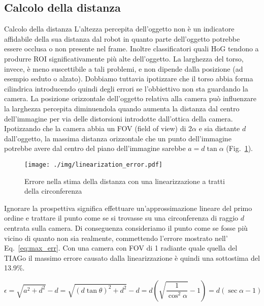 \documentclass[10pt]{beamer}
\begin{document}
	\subsection{Calcolo della distanza}\label{subsec:Calcolo-della-distanza}
	\begin{frame}[allowframebreaks]{Calcolo della distanza}
		L'altezza percepita dell'oggetto non è un indicatore affidabile della
		sua distanza dal robot in quanto parte dell'oggetto potrebbe essere
		occlusa o non presente nel frame. Inoltre classificatori quali HoG
		tendono a produrre ROI significativamente più alte dell'oggetto. La
		larghezza del torso, invece, è meno suscettibile a tali problemi, e non
		dipende dalla posizione (ad esempio seduto o alzato). Dobbiamo tuttavia
		ipotizzare che il torso abbia forma cilindrica introducendo quindi
		degli errori se l'obbiettivo non sta guardando la camera.	La
		posizione orizzontale dell'oggetto relativa alla camera può influenzare
		la larghezza percepita diminuendola quando aumenta la distanza dal
		centro dell'immagine per via delle distorsioni introdotte dall'ottica
		della camera. Ipotizzando che la camera abbia un FOV (field of view) di
		$2\alpha$ e sia distante $d$ dall'oggetto, la massima distanza
		orizzontale che un punto dell'immagine potrebbe avere dal centro del
		piano dell'immagine sarebbe $a = d \tan \alpha$ (Fig.~\ref{fig:error}).
		
		\begin{figure}[H]
			\centering
			\texttt{[image: ./img/linearization\_error.pdf]}
			\caption{Errore nella stima della distanza con una linearizzazione a tratti della circonferenza}
			\label{fig:error}
		\end{figure}
		
		Ignorare la prospettiva significa effettuare un'approssimazione lineare
		del primo ordine e trattare il punto come se si trovasse su una
		circonferenza di raggio $d$ centrata sulla camera. Di conseguenza
		consideriamo il punto come se fosse più vicino di quanto non sia
		realmente, commettendo l'errore mostrato nell' Eq.~\ref{eq:max_err}.
		Con una camera con FOV di 1 radiante quale quella del TIAGo il massimo
		errore causato dalla linearizzazione è quindi una sottostima del
		13.9\%.
		
		\begin{equation}
		\epsilon = 
		\sqrt{a^2+d^2} - d =
		\sqrt{(d\tan \theta )^2+d^2}-d =
		d\left( \sqrt{\frac{1}{\cos ^2 \alpha}}-1 \right) =
		d \left( \sec \alpha -1 \right) 
		\label{eq:max_err}
		\end{equation}
		

\end{frame}
\end{document}
